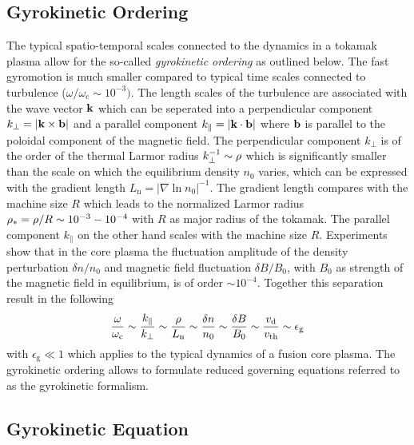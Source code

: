 \newpage

\subsection{Gyrokinetic Ordering}
\label{sub:gyroordering}

The typical spatio-temporal scales connected to the dynamics in a tokamak plasma allow for the so-called \textit{gyrokinetic ordering} as outlined below. The fast gyromotion is much smaller compared to typical  time scales connected to turbulence ($\omega/\omega_\mathrm{c} \sim 10^{-3})$. The length scales of the turbulence are associated with the wave vector $\boldsymbol{\mathbf{k}}$ which can be seperated into a perpendicular component $k_\perp = |\boldsymbol{\mathbf{k}} \times \boldsymbol{\mathbf{b}}|$ and a parallel component $k_\parallel = |\boldsymbol{\mathbf{k}} \cdot \boldsymbol{\mathbf{b}}|$ where $\boldsymbol{\mathbf{b}}$ is parallel to the poloidal component of the magnetic field. The perpendicular component $k_\perp$ is of the order of the thermal Larmor radius $k_\perp^{-1} \sim \rho$ which is significantly smaller than the scale on which the equilibrium density $n_0$ varies, which can be expressed with the gradient length $L_\mathrm{n} = |\nabla \ln n_0 |^{-1}$. The gradient length compares with the machine size $R$ which leads to the normalized Larmor radius $\rho_* = \rho/R \sim 10^{-3} - 10^{-4}$ with $R$ as major radius of the tokamak. The parallel component $k_\parallel$ on the other hand scales with the machine size $R$. Experiments show that in the core plasma the fluctuation amplitude of the density perturbation $\delta n/n_0$ and magnetic field fluctuation $\delta B/B_0$, with $B_0$ as strength of the magnetic field in equilibrium, is of order $\sim 10^{-4}$. Together this separation result in the following
\begin{gather}
	\frac{\omega}{\omega_\mathrm{c}} \sim \frac{k_\parallel}{k_\perp} \sim \frac{\rho}{L_\mathrm{n}} \sim \frac{\delta n}{n_0} \sim \frac{\delta B}{B_0} \sim \frac{v_\mathrm{d}}{v_{\mathrm{th}}} \sim \epsilon_\mathrm{g}
	\label{eq:gyroordering}
\end{gather}
with $\epsilon_\mathrm{g} \ll 1$ which applies to the typical dynamics of a fusion core plasma. \cite{Brizard2007,Garbet2010} The gyrokinetic ordering allows to formulate reduced governing equations referred to as the gyrokinetic formalism.

\newpage

\subsection{Gyrokinetic Equation}
\label{sub:gyrokinetic}
 
